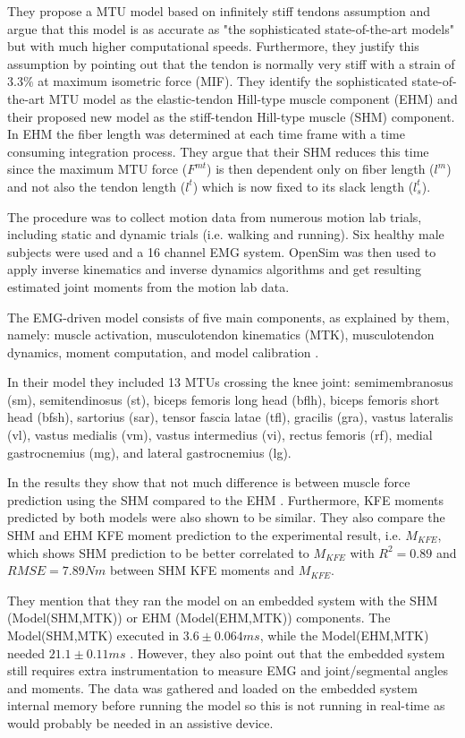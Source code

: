 They propose a MTU model based on infinitely stiff tendons assumption and argue that this model is as accurate as "the sophisticated state-of-the-art models" \cite[p. 2]{Sartori2012} but with much higher computational speeds. Furthermore, they justify this assumption by pointing out that the tendon is normally very stiff with a strain of $3.3\%$ at maximum isometric force (MIF). They identify the sophisticated state-of-the-art MTU model as the elastic-tendon Hill-type muscle component (EHM) and their proposed new model as the stiff-tendon Hill-type muscle (SHM) component. In EHM the fiber length was determined at each time frame with a time consuming integration process. They argue that their SHM reduces this time since the maximum MTU force ($F^{mt}$) is then dependent only on fiber length ($l^m$) and not also the tendon length ($l^t$) which is now fixed to its slack length ($l^t_s$).

The procedure was to collect motion data from numerous motion lab trials, including static and dynamic trials (i.e. walking and running).
Six healthy male subjects were used and a 16 channel EMG system.
OpenSim was then used to apply inverse kinematics and inverse dynamics algorithms and get resulting estimated joint moments from the motion lab data.

The EMG-driven model consists of five main components, as explained by them, namely: muscle activation, musculotendon kinematics (MTK), musculotendon dynamics, moment computation, and model calibration \cite[p. 4]{Sartori2012}.

In their model they included 13 MTUs crossing the knee joint: semimembranosus (sm), semitendinosus (st), biceps femoris long head (bflh), biceps femoris short head (bfsh), sartorius (sar), tensor fascia latae (tfl), gracilis (gra), vastus lateralis (vl), vastus medialis (vm), vastus intermedius (vi), rectus femoris (rf), medial gastrocnemius (mg), and lateral gastrocnemius (lg).

In the results they show that not much difference is between muscle force prediction using the SHM compared to the EHM \cite[Fig. 3]{Sartori2012}. Furthermore, KFE moments predicted by both models were also shown to be similar. They also compare the SHM and EHM KFE moment prediction to the experimental result, i.e. $M_{KFE}$, which shows SHM prediction to be better correlated to $M_{KFE}$ \cite[Fig. 4]{Sartori2012} with $R^2 = 0.89$ and $RMSE = 7.89Nm$ between SHM KFE moments and $M_{KFE}$.

They mention that they ran the model on an embedded system with the SHM (Model(SHM,MTK)) or EHM (Model(EHM,MTK)) components. 
The Model(SHM,MTK) executed in $3.6 \pm 0.064 ms$, while the Model(EHM,MTK) needed $21.1 \pm 0.11 ms$ \cite[p. 8]{Sartori2012}.
However, they also point out that the embedded system still requires extra instrumentation to measure EMG and joint/segmental angles and moments. The data was gathered and loaded on the embedded system internal memory before running the model so this is not running in real-time as would probably be needed in an assistive device.

